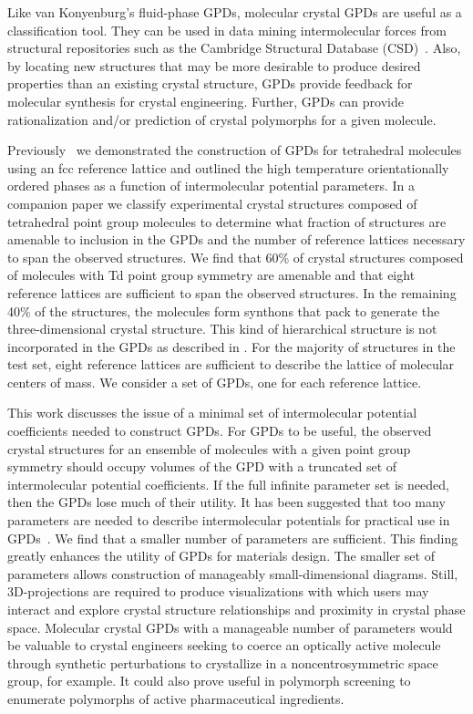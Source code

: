 \documentclass[preprint]{iucr}              %
\begin{document}
Like van Konyenburg's fluid-phase GPDs, molecular crystal GPDs are useful as a
classification tool.  They can be used in data mining intermolecular forces from
structural repositories such as the Cambridge Structural Database
(CSD)~\cite{Allen02}.  Also, by locating new structures that may be more
desirable to produce desired properties than an existing crystal structure, GPDs
provide feedback for molecular synthesis for crystal engineering. Further, GPDs
can provide rationalization and/or prediction of crystal polymorphs for a given
molecule.

Previously~\cite{Mettes04} we demonstrated the construction of GPDs for
tetrahedral molecules using an fcc reference lattice and outlined the high
temperature orientationally ordered phases as a function of intermolecular
potential parameters.  In a companion paper\cite{McClurg09} we classify
experimental crystal structures composed of tetrahedral point group molecules to
determine what fraction of structures are amenable to inclusion in the GPDs and
the number of reference lattices necessary to span the observed structures.  We
find that 60\% of crystal structures composed of molecules with Td point group
symmetry are amenable and that eight reference lattices are sufficient to span
the observed structures.  In the remaining 40\% of the structures, the molecules
form synthons that pack to generate the three-dimensional crystal structure. 
This kind of hierarchical structure is not incorporated in the GPDs as described
in \cite{Mettes04}.  For the majority of structures in the test set, eight
reference lattices are sufficient to describe the lattice of molecular centers
of mass.  We consider a set of GPDs, one for each reference lattice.  

This work discusses the issue of a minimal set of intermolecular potential
coefficients needed to construct GPDs.  For GPDs to be useful, the observed
crystal structures for an ensemble of molecules with a given point group
symmetry should occupy volumes of the GPD with a truncated set of intermolecular
potential coefficients.  If the full infinite parameter set is needed, then the
GPDs lose much of their utility.  It has been suggested that too many parameters
are needed to describe intermolecular potentials for practical use in
GPDs~\cite{Briels80}.  We find that a smaller number of parameters are
sufficient.  This finding greatly enhances the utility of GPDs for materials
design. The smaller set of parameters allows construction of manageably
small-dimensional diagrams.  Still, 3D-projections are required to produce
visualizations with which users may interact and explore crystal structure
relationships and proximity in crystal phase space.  Molecular crystal GPDs with
a manageable number of parameters would be valuable to crystal engineers seeking
to coerce an optically active molecule through synthetic perturbations to
crystallize in a noncentrosymmetric space group, for example. It could also
prove useful in polymorph screening to enumerate polymorphs of active
pharmaceutical ingredients. 
\end{document}

